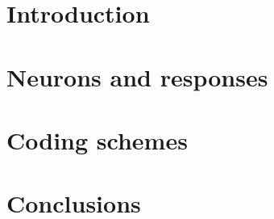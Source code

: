 \section{Introduction}
\section{Neurons and responses}
\section{Coding schemes}
\section{Conclusions}
